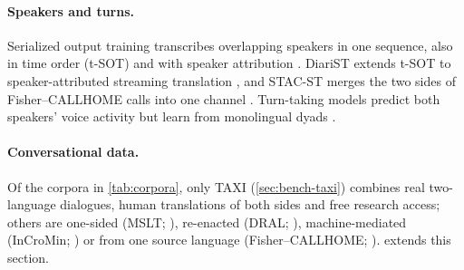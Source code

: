 \paragraph{Speakers and turns.}
Serialized output training transcribes overlapping speakers in one sequence, also in time order (t-SOT) and with speaker attribution \citep{kanda2020serialized,kanda2022streaming,kanda2022streamingspeaker}.
DiariST extends t-SOT to speaker-attributed streaming translation \citep{yang2024diarist}, and STAC-ST merges the two sides of Fisher--CALLHOME calls into one channel \citep{zuluagagomez2023end}.
Turn-taking models predict both speakers' voice activity but learn from monolingual dyads \citep{ekstedt2022voice,inoue2024multilingual}.

\paragraph{Conversational data.}
Of the corpora in \cref{tab:corpora}, only TAXI (\cref{sec:bench-taxi}) combines real two-language dialogues, human translations of both sides and free research access; others are one-sided (MSLT; \citealp{federmann2016microsoft}), re-enacted (DRAL; \citealp{ward2024dialogs}), machine-mediated (InCroMin; \citealp{cechovic2025corpus}) or from one source language (Fisher--CALLHOME; \citealp{post2013improved}).
 extends this section.

